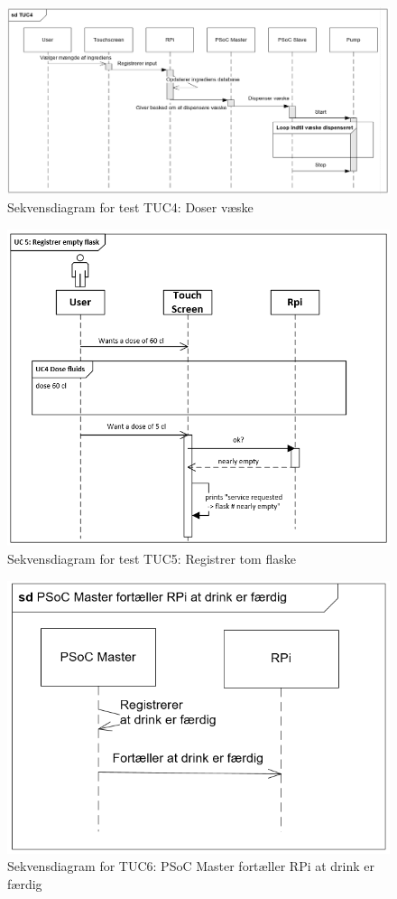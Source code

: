\begin{figure}[H]
	\centering
	\includegraphics[width=1\textwidth]{Images/TUC4.png}
	\caption{Sekvensdiagram for test TUC4: Doser væske}
	\label{fig:testUC4}
\end{figure}
\begin{figure}[H]
	\centering
	\includegraphics[width=1\textwidth]{Images/testUC5.png}
	\caption{Sekvensdiagram for test TUC5: Registrer tom flaske}
	\label{fig:testUC5}
\end{figure}

\begin{figure}[H]
    \centering
    \includegraphics[width=1\textwidth]{Images/sdTestUC6.png}
    \caption{Sekvensdiagram for TUC6: PSoC Master fortæller RPi at drink er færdig}
    \label{fig:testUC6}
\end{figure}